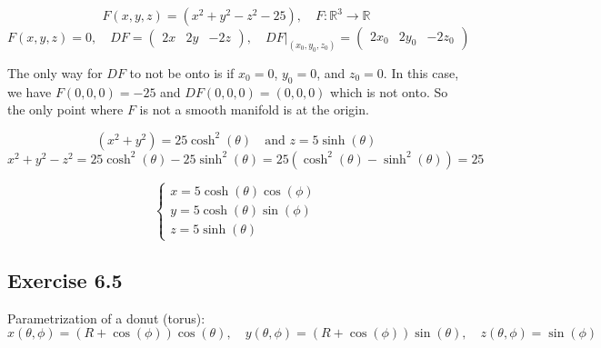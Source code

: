 \documentclass[11pt]{article}
\begin{document}
\begin{center}
\end{center}

\[
F(x,y,z) = (x^2 + y^2 - z^2 - 25), \quad F : \mathbb{R}^3 \rightarrow \mathbb{R}
\]
\[
F(x,y,z) = 0, \quad DF = \begin{pmatrix}
    2x & 2y & -2z
\end{pmatrix}, \quad DF \big|_{(x_0,y_0,z_0)} = \begin{pmatrix}
    2x_0 & 2y_0 & -2z_0 \end{pmatrix}
\]

The only way for $DF$ to not be onto is if $x_0 = 0$, $y_0 = 0$, and $z_0 = 0$. In this case, we have $F(0,0,0) = -25$ and $DF(0,0,0) = (0,0,0)$ which is not onto. So the only point where $F$ is not a smooth manifold is at the origin.

\[
(x^2 + y^2) = 25 \cosh^2(\theta) \quad \text{and } z = 5 \sinh(\theta)
\]
\[
x^2 + y^2 - z^2 = 25 \cosh^2(\theta) - 25 \sinh^2(\theta) = 25 (\cosh^2(\theta) - \sinh^2(\theta)) = 25
\]

\[
\begin{cases}
    x = 5 \cosh(\theta) \cos(\phi) \\
    y = 5 \cosh(\theta) \sin(\phi) \\
    z = 5 \sinh(\theta)
\end{cases} 
\]

\subsection*{Exercise 6.5}
Parametrization of a donut (torus):
\[
x(\theta, \phi) = (R + \cos(\phi)) \cos(\theta), \quad y(\theta, \phi) = (R + \cos(\phi)) \sin(\theta), \quad z(\theta, \phi) = \sin(\phi)
\]
\end{document}
